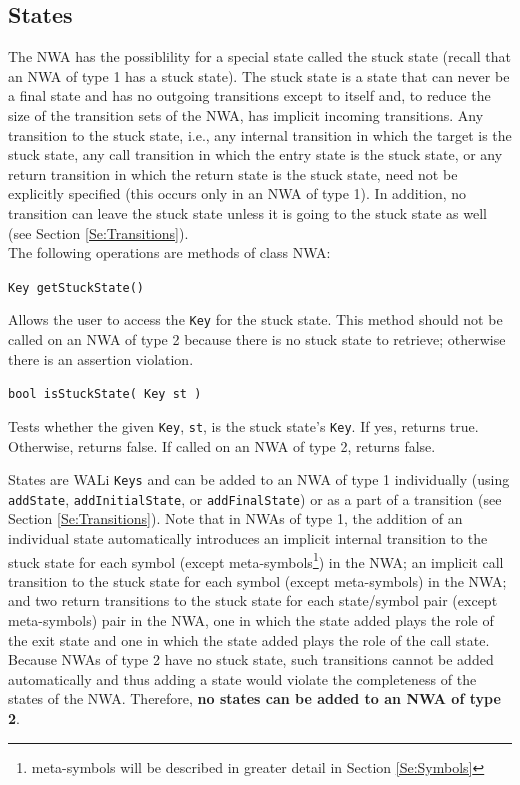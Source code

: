 \documentclass{llncs}
\begin{document}
\subsection{States}
\label{Se:States}

The NWA has the possiblility for a special state called the stuck state (recall that an NWA of type 1 has a stuck state).  The stuck state is a state that can never be a final state and has no outgoing transitions except to itself and, to reduce the size of the transition sets of the NWA, has implicit incoming transitions.  Any transition to the stuck state, i.e., any internal transition in which the target is the stuck state, any call transition in which the entry state is the stuck state, or any return transition in which the return state is the stuck state, need not be explicitly specified (this occurs only in an NWA of type 1).  In addition, no transition can leave the stuck state unless it is going to the stuck state as well (see Section \ref{Se:Transitions}). \\

\noindent The following operations are methods of class NWA:

\begin{description}

  \item\texttt{Key getStuckState()} \nopagebreak

    Allows the user to access the \texttt{Key} for the stuck state.  This method should not be called on an NWA of type 2 because there is no stuck state to retrieve; otherwise there is an assertion violation. 

  \item\texttt{bool isStuckState( Key st )} \nopagebreak

    Tests whether the given \texttt{Key}, \texttt{st}, is the stuck state's \texttt{Key}.  If yes, returns true.  Otherwise, returns false.  If called on an NWA of type 2, returns false. \\

\end{description}

States are WALi \texttt{Keys} and can be added to an NWA of type 1 individually (using \texttt{addState}, \texttt{addInitialState}, or \texttt{addFinalState}) or as a part of a transition (see Section \ref{Se:Transitions}).  Note that in NWAs of type 1, the addition of an individual state automatically introduces an implicit internal transition to the stuck state for each symbol (except meta-symbols\footnote{meta-symbols will be described in greater detail in Section \ref{Se:Symbols}}) in the NWA; an implicit call transition to the stuck state for each symbol (except meta-symbols) in the NWA; and two return transitions to the stuck state for each state/symbol pair (except meta-symbols) pair in the NWA, one in which the state added plays the role of the exit state and one in which the state added plays the role of the call state.  Because NWAs of type 2 have no stuck state, such transitions cannot be added automatically and thus adding a state would violate the completeness of the states of the NWA.  Therefore, \textbf{no states can be added to an NWA of type 2}. \\
\end{document}
